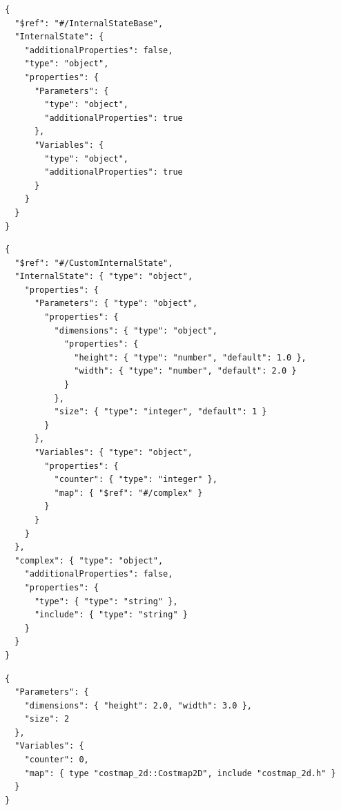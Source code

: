 \begin{lstlisting}[frame=tb,caption={Base schema of the internal state defined using JSON schema},label=lst:json-is-base]
{
  "$ref": "#/InternalStateBase",
  "InternalState": {
    "additionalProperties": false,
    "type": "object",
    "properties": {
      "Parameters": {
        "type": "object",
        "additionalProperties": true
      },
      "Variables": {
        "type": "object",
        "additionalProperties": true
      }
    }
  }
}
\end{lstlisting}

\begin{lstlisting}[frame=tb,caption={Internal state defined using JSON schema},label=lst:json-is]
{
  "$ref": "#/CustomInternalState",
  "InternalState": { "type": "object",
    "properties": {
      "Parameters": { "type": "object",
        "properties": {
          "dimensions": { "type": "object",
            "properties": {
              "height": { "type": "number", "default": 1.0 },
              "width": { "type": "number", "default": 2.0 }
            }
          },
          "size": { "type": "integer", "default": 1 }
        }
      },
      "Variables": { "type": "object",
        "properties": {
          "counter": { "type": "integer" },
          "map": { "$ref": "#/complex" }
        }
      }
    }
  },
  "complex": { "type": "object",
    "additionalProperties": false,
    "properties": {
      "type": { "type": "string" },
      "include": { "type": "string" }
    }
  }
}
\end{lstlisting}

\begin{lstlisting}[frame=tb,caption={Internal state instance defined in JSON},label=lst:json-inst]
{
  "Parameters": {
    "dimensions": { "height": 2.0, "width": 3.0 },
    "size": 2
  },
  "Variables": {
    "counter": 0,
    "map": { type "costmap_2d::Costmap2D", include "costmap_2d.h" }
  }
}
\end{lstlisting}

